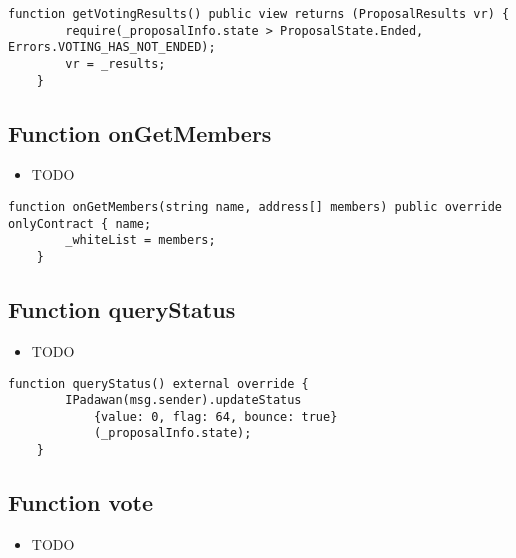 \begin{lstlisting}[firstnumber=203]
    function getVotingResults() public view returns (ProposalResults vr) {
        require(_proposalInfo.state > ProposalState.Ended, Errors.VOTING_HAS_NOT_ENDED);
        vr = _results;
    }
\end{lstlisting}

\subsection{Function onGetMembers}

\begin{itemize}
\item TODO
\end{itemize}

\begin{lstlisting}[firstnumber=220]
    function onGetMembers(string name, address[] members) public override onlyContract { name;
        _whiteList = members;
    }
\end{lstlisting}

\subsection{Function queryStatus}

\begin{itemize}
\item TODO
\end{itemize}

\begin{lstlisting}[firstnumber=191]
    function queryStatus() external override {
        IPadawan(msg.sender).updateStatus
            {value: 0, flag: 64, bounce: true}
            (_proposalInfo.state);
    }
\end{lstlisting}

\subsection{Function vote}

\begin{itemize}
\item TODO
\end{itemize}

